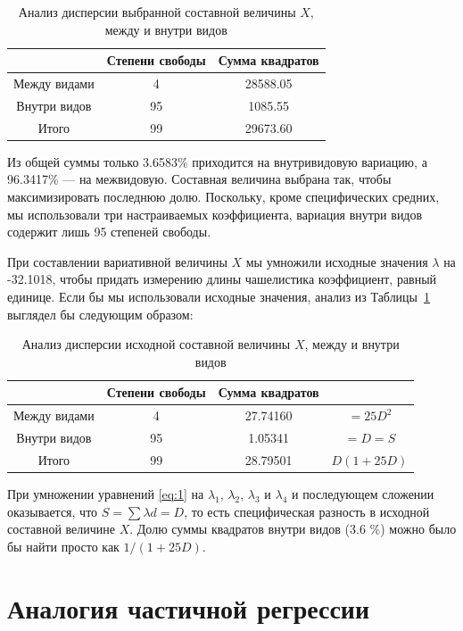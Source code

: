 \documentclass[12pt]{article}
\begin{document}
\begin{table}[H]
\centering
\footnotesize
\caption{Анализ дисперсии выбранной составной величины $X$, между и внутри видов}
\label{tab:5}
\begin{tabular}{|c|c|c|}
\hline
 & Степени свободы & Сумма квадратов \\
\hline
Между видами & 4  & 28588.05 \\
Внутри видов  & 95 & 1085.55  \\
\hline
Итого         & 99 & 29673.60 \\
\hline
\end{tabular}
\end{table}
Из общей суммы только 3.6583\% приходится на внутривидовую вариацию, а 96.3417\% — на межвидовую.  
Составная величина выбрана так, чтобы максимизировать последнюю долю. Поскольку, кроме специфических средних, мы использовали три настраиваемых коэффициента, вариация внутри видов содержит лишь 95 степеней свободы.

При составлении вариативной величины $X$ мы умножили исходные значения $\lambda$ на -32.1018, чтобы придать измерению длины чашелистика коэффициент, равный единице.  
Если бы мы использовали исходные значения, анализ из Таблицы~\ref{tab:5} выглядел бы следующим образом:

\begin{table}[H]
\centering
\footnotesize
\caption{Анализ дисперсии исходной составной величины $X$, между и внутри видов}
\label{tab:6}
\begin{tabular}{|c|c|c|c|}
\hline
 & Степени свободы & Сумма квадратов & \\
\hline
Между видами & 4  & 27.74160 & $=25 D^2$ \\
Внутри видов  & 95 & 1.05341  & $=D=S$ \\
\hline
Итого         & 99 & 28.79501 & $D(1+25D)$ \\
\hline
\end{tabular}
\end{table}

При умножении уравнений \eqref{eq:1} на $\lambda_{1}$, $\lambda_{2}$, $\lambda_{3}$ и $\lambda_{4}$ и последующем сложении оказывается, что
$S = \sum{\lambda d} = D$, то есть специфическая разность в исходной составной величине $X$.  
Долю суммы квадратов внутри видов (3.6 \%) можно было бы найти просто как $1 / (1 + 25 D)$.

\section{Аналогия частичной регрессии}
\end{document}
